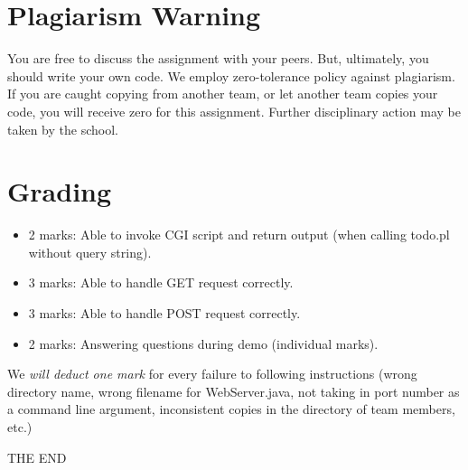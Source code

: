 \documentclass[a4paper,11pt]{exam}
\begin{document}
\section*{Plagiarism Warning}

You are free to discuss the assignment with your peers. But, ultimately, you should write your own code. We employ zero-tolerance policy against plagiarism. If you are caught copying from another team, or let another team copies your code, you will receive zero for this assignment. Further disciplinary action may be taken by the school.

\section*{Grading}

\begin{itemize}
\item 2 marks: Able to invoke CGI script and return output (when calling todo.pl without query string).
\item 3 marks: Able to handle GET request correctly.
\item 3 marks: Able to handle POST request correctly.
\item 2 marks: Answering questions during demo (individual marks).
\end{itemize}

We \textit{will deduct one mark} for every failure to following instructions (wrong directory name, wrong filename for WebServer.java, not taking in port number as a command line argument, inconsistent copies in the directory of team members, etc.)

\vfill
\center\Huge{THE END}
\end{document}

